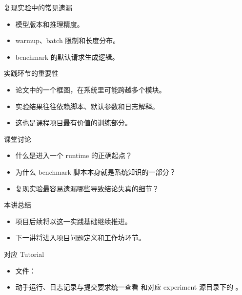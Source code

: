 \begin{frame}{复现实验中的常见遗漏}
  \begin{itemize}
    \item 模型版本和推理精度。
    \item warmup、batch 限制和长度分布。
    \item benchmark 的默认请求生成逻辑。
  \end{itemize}
\end{frame}

\begin{frame}{实践环节的重要性}
  \begin{itemize}
    \item 论文中的一个框图，在系统里可能跨越多个模块。
    \item 实验结果往往依赖脚本、默认参数和日志解释。
    \item 这也是课程项目最有价值的训练部分。
  \end{itemize}
\end{frame}



\begin{frame}{课堂讨论}
  \begin{itemize}
    \item 什么是进入一个 runtime 的正确起点？
    \item 为什么 benchmark 脚本本身就是系统知识的一部分？
    \item 复现实验最容易遗漏哪些导致结论失真的细节？
  \end{itemize}
\end{frame}

\begin{frame}{本讲总结}
  \begin{itemize}
    \item 项目后续将以这一实践基础继续推进。
    \item 下一讲将进入项目问题定义和工作坊环节。
  \end{itemize}
\end{frame}

\begin{frame}{对应 Tutorial}
  \begin{itemize}
    \item 文件：\texttt{}
    \item 动手运行、日志记录与提交要求统一查看 \texttt{} 和对应 experiment 源目录下的 \texttt{}。
  \end{itemize}
\end{frame}

